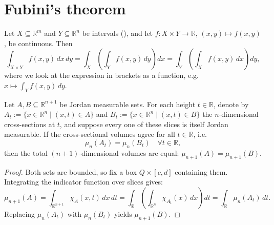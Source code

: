 
\section{Fubini's theorem}
\label{sec:fubini}

\begin{theorem}[Fubini]
\label{thm:fubini}
Let $X \subseteq \mathbb{R}^m$ and $Y \subseteq \mathbb{R}^n$ be intervals (), and let
$f : X\times Y \to \mathbb{R}$, $(x,y)\mapsto f(x,y)$, be continuous. Then
\[\int_{X\times Y} f(x,y)\,dx\,dy
  = \int_X\left(\int_Y f(x,y)\,dy\right)dx
  = \int_Y\left(\int_X f(x,y)\,dx\right)dy,\]
where we look at the expression in brackets as a function, e.g.\
$x \mapsto \int_Y f(x,y)\,dy$.
\end{theorem}

\begin{proposition}
\label{prop:cavalieri_principle}
Let $A, B \subseteq \mathbb{R}^{n+1}$ be Jordan measurable sets. For each height $t \in \mathbb{R}$, denote by $A_t := \{x \in \mathbb{R}^n \mid (x,t) \in A\}$ and $B_t := \{x \in \mathbb{R}^n \mid (x,t) \in B\}$ the $n$-dimensional cross-sections at $t$, and suppose every one of these slices is itself Jordan measurable. If the cross-sectional volumes agree for all $t \in \mathbb{R}$, i.e.\
\[
\mu_n(A_t) = \mu_n(B_t) \quad \forall t \in \mathbb{R},
\]
then the total $(n+1)$-dimensional volumes are equal: $\mu_{n+1}(A) = \mu_{n+1}(B)$.
\end{proposition}

\begin{proof}
Both sets are bounded, so fix a box $Q\times[c,d]$ containing them. Integrating the indicator
function over slices gives:
\[
\mu_{n+1}(A) = \int_{\mathbb{R}^{n+1}} \chi_A(x,t) \,dx\,dt = \int_{\mathbb{R}} \left( \int_{\mathbb{R}^n} \chi_{A_t}(x) \,dx \right) dt = \int_{\mathbb{R}} \mu_n(A_t) \,dt.
\]
Replacing $\mu_n(A_t)$ with $\mu_n(B_t)$ yields $\mu_{n+1}(B)$.
\end{proof}

